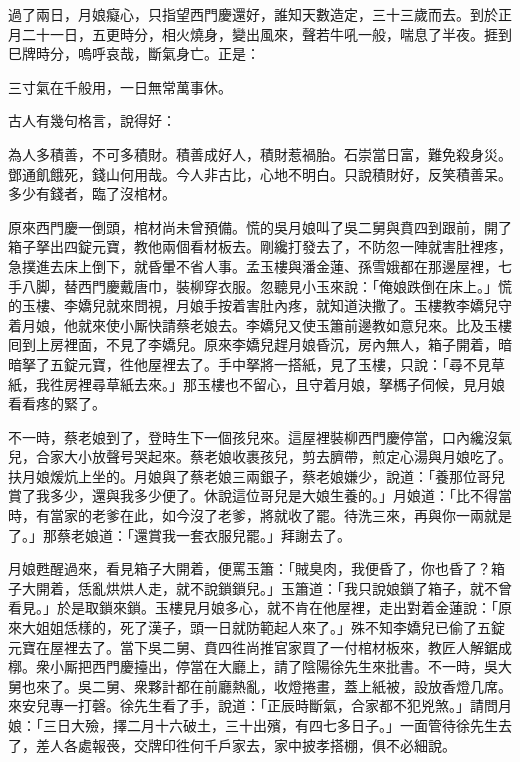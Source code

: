 過了兩日，月娘癡心，只指望西門慶還好，誰知天數造定，三十三歲而去。到於正月二十一日，五更時分，相火燒身，變出風來，聲若牛吼一般，喘息了半夜。捱到巳牌時分，嗚呼哀哉，斷氣身亡。正是：

三寸氣在千般用，一日無常萬事休。{}

古人有幾句格言，說得好：

\begin{myquote} 
為人多積善，不可多積財。積善成好人，積財惹禍胎。石崇當日富，難免殺身災。鄧通飢餓死，錢山何用哉。今人非古比，心地不明白。只說積財好，反笑積善呆。多少有錢者，臨了沒棺材。
\end{myquote} 

原來西門慶一倒頭，棺材尚未曾預備。慌的吳月娘叫了吳二舅與賁四到跟前，開了箱子拏出四錠元寶，教他兩個看材板去。剛纔打發去了，不防忽一陣就害肚裡疼，急撲進去床上倒下，就昏暈不省人事。孟玉樓與潘金蓮、孫雪娥都在那邊屋裡，七手八脚，替西門慶戴唐巾，裝柳穿衣服。忽聽見小玉來說：「俺娘跌倒在床上。」慌的玉樓、李嬌兒就來問視，月娘手按着害肚內疼，就知道決撒了。玉樓教李嬌兒守着月娘，他就來使小厮快請蔡老娘去。李嬌兒又使玉簫前邊教如意兒來。比及玉樓囘到上房裡面，不見了李嬌兒。原來李嬌兒趕月娘昏沉，房內無人，箱子開着，暗暗拏了五錠元寶，徃他屋裡去了。手中拏將一搭紙，見了玉樓，只說：「尋不見草紙，我徃房裡尋草紙去來。」那玉樓也不留心，且守着月娘，拏榪子伺候，見月娘看看疼的緊了。

不一時，蔡老娘到了，登時生下一個孩兒來。這屋裡裝柳西門慶停當，口內纔沒氣兒，合家大小放聲号哭起來。蔡老娘收裹孩兒，剪去臍帶，煎定心湯與月娘吃了。扶月娘煖炕上坐的。月娘與了蔡老娘三兩銀子，蔡老娘嫌少，說道：「養那位哥兒賞了我多少，還與我多少便了。休說這位哥兒是大娘生養的。」月娘道：「比不得當時，有當家的老爹在此，如今沒了老爹，將就收了罷。待洗三來，再與你一兩就是了。」那蔡老娘道：「還賞我一套衣服兒罷。」拜謝去了。

月娘甦醒過來，看見箱子大開着，便罵玉簫：「賊臭肉，我便昏了，你也昏了？箱子大開着，恁亂烘烘人走，就不說鎖鎖兒。」玉簫道：「我只說娘鎖了箱子，就不曾看見。」於是取鎖來鎖。玉樓見月娘多心，就不肯在他屋裡，走出對着金蓮說：「原來大姐姐恁樣的，死了漢子，頭一日就防範起人來了。」殊不知李嬌兒已偷了五錠元寶在屋裡去了。當下吳二舅、賁四徃尚推官家買了一付棺材板來，教匠人解鋸成槨。衆小厮把西門慶擡出，停當在大廳上，請了陰陽徐先生來批書。不一時，吳大舅也來了。吳二舅、衆夥計都在前廳熱亂，收燈捲畫，蓋上紙被，設放香燈几席。來安兒專一打磬。徐先生看了手，說道：「正辰時斷氣，合家都不犯兇煞。」請問月娘：「三日大殮，擇二月十六破土，三十出殯，有四七多日子。」一面管待徐先生去了，差人各處報䘮，交牌印徃何千戶家去，家中披孝搭棚，俱不必細說。

